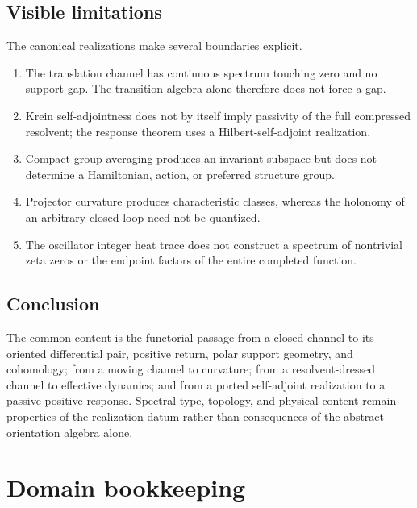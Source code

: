 \documentclass[11pt,reqno]{scrartcl}
\theoremstyle{plain}
\theoremstyle{definition}
\theoremstyle{remark}
\begin{document}
\subsection{Visible limitations}

The canonical realizations make several boundaries explicit.
\begin{enumerate}[label=\textbf{O\arabic*.},leftmargin=3.5em]
  \item The translation channel has continuous spectrum touching zero and no
  support gap.  The transition algebra alone therefore does not force a gap.
  \item Krein self-adjointness does not by itself imply passivity of the full
  compressed resolvent; the response theorem uses a Hilbert-self-adjoint
  realization.
  \item Compact-group averaging produces an invariant subspace but does not
  determine a Hamiltonian, action, or preferred structure group.
  \item Projector curvature produces characteristic classes, whereas the
  holonomy of an arbitrary closed loop need not be quantized.
  \item The oscillator integer heat trace does not construct a spectrum of
  nontrivial zeta zeros or the endpoint factors of the entire completed
  function.
\end{enumerate}

\subsection{Conclusion}

The common content is the functorial passage from a closed channel to its
oriented differential pair, positive return, polar support geometry, and
cohomology; from a moving channel to curvature; from a resolvent-dressed
channel to effective dynamics; and from a ported self-adjoint realization to
a passive positive response.  Spectral type, topology, and physical content
remain properties of the realization datum rather than consequences of the
abstract orientation algebra alone.


\clearpage
\appendix

\section{Domain bookkeeping}
\label{app:domains}
\end{document}
